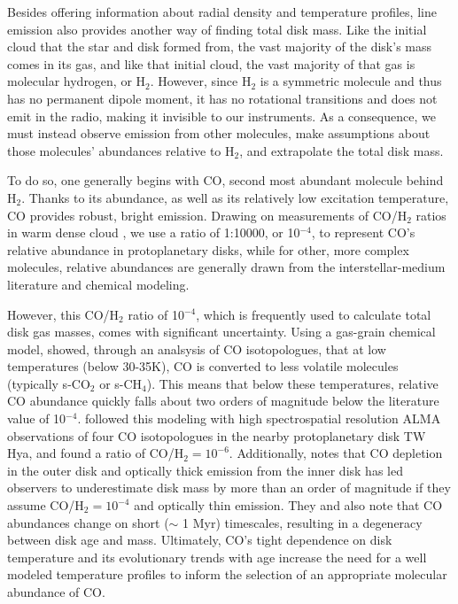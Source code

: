 Besides offering information about radial density and temperature profiles, line emission also provides another way of finding total disk mass. Like the initial cloud that the star and disk formed from, the vast majority of the disk's mass comes in its gas, and like that initial cloud, the vast majority of that gas is molecular hydrogen, or H$_2$. However, since H$_2$ is a symmetric molecule and thus has no permanent dipole moment, it has no rotational transitions and does not emit in the radio, making it invisible to our instruments. As a consequence, we must instead observe emission from other molecules, make assumptions about those molecules' abundances relative to H$_2$, and extrapolate the total disk mass.


To do so, one generally begins with CO, second most abundant molecule behind H$_2$. Thanks to its abundance, as well as its relatively low excitation temperature, CO provides robust, bright emission. Drawing on measurements of CO/H$_2$ ratios in warm dense cloud \citep{AikawaHerbst1999,Fogel2011}, we use a ratio of 1:10000, or 10$^{-4}$, to represent CO's relative abundance in protoplanetary disks, while for other, more complex molecules, relative abundances are generally drawn from the interstellar-medium literature and chemical modeling.

However, this CO/H$_2$ ratio of 10$^{-4}$, which is frequently used to calculate total disk gas masses, comes with significant uncertainty. Using a gas-grain chemical model, \citet{Reboussin2015} showed, through an analsysis of CO isotopologues, that at low temperatures (below 30-35K), CO is converted to less volatile molecules (typically s-CO$_2$ or s-CH$_4$). This means that below these temperatures, relative CO abundance quickly falls about two orders of magnitude below the literature value of 10$^{-4}$. \citet{Schwarz2016} followed this modeling with high spectrospatial resolution ALMA observations of four CO isotopologues in the nearby protoplanetary disk TW Hya, and found a ratio of CO/H$_2 = 10^{-6}$. Additionally, \cite{Yu2017} notes that CO depletion in the outer disk and optically thick emission from the inner disk has led observers \citep[e.g.][who found surprisingly low disk masses in their survey of ONC proplyds]{Ansdell2017} to underestimate disk mass by more than an order of magnitude if they assume CO/H$_2 = 10^{-4}$ and optically thin emission. They and \cite{Cleeves2015} also note that CO abundances change on short ($\sim$ 1 Myr) timescales, resulting in a degeneracy between disk age and mass. Ultimately, CO's tight dependence on disk temperature and its evolutionary trends with age increase the need for a well modeled temperature profiles to inform the selection of an appropriate molecular abundance of CO.



